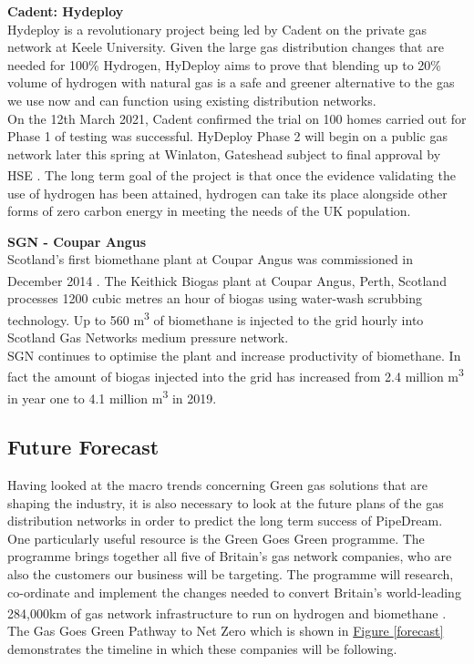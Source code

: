 \documentclass[11pt]{article}		%
\newcommand{\supercite}[1]{\textsuperscript{\cite{#1}}}		%
\newcommand{\figref}[1]{\hyperref[#1]{Figure \ref*{#1}}}    %
\begin{document}
    		\textbf{Cadent: Hydeploy}\\
            Hydeploy is a revolutionary project being led by Cadent on the private gas network at Keele University. Given the large gas distribution changes that are needed for 100\% Hydrogen, HyDeploy aims to prove that blending up to 20\% volume of hydrogen with natural gas is a safe and greener alternative to the gas we use now and can function using existing distribution networks.\\
            \hspace*{3ex}On the 12th March 2021, Cadent confirmed the trial on 100 homes carried out for Phase 1 of testing was successful. HyDeploy Phase 2 will begin on a public gas network later this spring at Winlaton, Gateshead subject to final approval by HSE \supercite{hydeploy}. The long term goal of the project is that once the evidence validating the use of hydrogen has been attained, hydrogen can take its place alongside other forms of zero carbon energy in meeting the needs of the UK population.
    
    		\textbf{SGN - Coupar Angus}\\
    
            Scotland’s first biomethane plant at Coupar Angus was commissioned in December 2014 \supercite{coupar}. The Keithick Biogas plant at Coupar Angus, Perth, Scotland processes 1200 cubic metres an hour of biogas using water-wash scrubbing technology. Up to 560 m\textsuperscript{3}  of biomethane is injected to the grid hourly into Scotland Gas Networks medium pressure network.\\
    	    \hspace*{3ex}SGN continues to optimise the plant and increase productivity of biomethane. In fact the amount of biogas injected into the grid has increased from 2.4 million m\textsuperscript{3} in year one to 4.1 million m\textsuperscript{3} in 2019\supercite{CAperforamnce}.
    
    		\subsection[Future Forecast]{Future Forecast}
    		
    		Having looked at the macro trends concerning Green gas solutions that are shaping the industry, it is also necessary to look at the future plans of the gas distribution networks in order to predict the long term success of PipeDream. \\
        	\hspace*{3ex}One particularly useful resource is the Green Goes Green programme. The programme brings together all five of Britain’s gas network companies, who are also the customers our business will be targeting. The programme will research, co-ordinate and implement the changes needed to convert Britain’s world-leading 284,000km of gas network infrastructure to run on hydrogen and biomethane \supercite{gasgoesgreen}. The Gas Goes Green Pathway to Net Zero which is shown in \figref{forecast} demonstrates the timeline in which these companies will be following.
    
\end{document}

